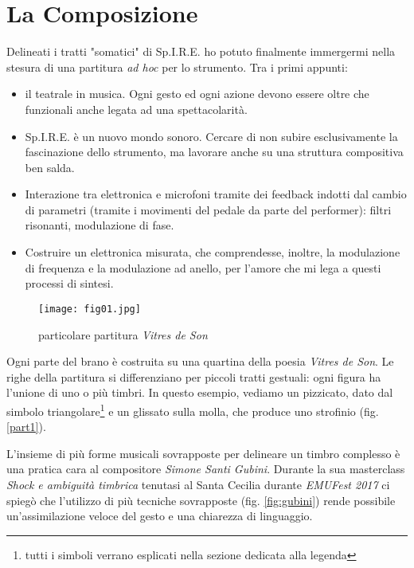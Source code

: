 
\chapter{La Composizione}
\label{chp:La Composizione}

Delineati i tratti "somatici" di Sp.I.R.E. ho potuto finalmente immergermi nella stesura di una partitura \textit{ad hoc} per lo strumento. Tra i primi appunti:

\begin{itemize}
\item{il teatrale in musica. Ogni gesto ed ogni azione devono essere oltre che funzionali anche legata ad una spettacolarità.}
\item{Sp.I.R.E. è un nuovo mondo sonoro. Cercare di non subire esclusivamente la fascinazione dello strumento, ma lavorare anche su una struttura compositiva ben salda.}
\item{Interazione tra elettronica e microfoni tramite dei feedback indotti dal cambio di parametri (tramite i movimenti del pedale da parte del performer): filtri risonanti, modulazione di fase.}
\item{Costruire un elettronica misurata, che comprendesse, inoltre, la modulazione di frequenza e la modulazione ad anello, per l'amore che mi lega a questi processi di sintesi.}
\end{itemize}


\begin{wrapfigure}{r}{5cm}
\centering
\texttt{[image: fig01.jpg]}
\caption{particolare partitura \textit{Vitres de Son}}
\label{fig:part1}
\end{wrapfigure}

Ogni parte del brano è costruita su una quartina della poesia \textit{Vitres de Son}. Le righe della partitura si differenziano per piccoli tratti gestuali: ogni figura ha l'unione di uno o più timbri. In questo esempio, vediamo un pizzicato, dato dal simbolo triangolare\footnote{tutti i simboli verrano esplicati nella sezione dedicata alla legenda} e un glissato sulla molla, che produce uno strofinio (fig. \ref{part1}). 

L'insieme di più forme musicali sovrapposte per delineare un timbro complesso è una pratica cara al compositore \textit{Simone Santi Gubini}. Durante la sua masterclass \textit{Shock e ambiguità timbrica} tenutasi al Santa Cecilia durante \textit{EMUFest 2017} ci spiegò che l'utilizzo di più tecniche sovrapposte (fig. \ref{fig:gubini}) rende possibile un'assimilazione veloce del gesto e una chiarezza di linguaggio. 

